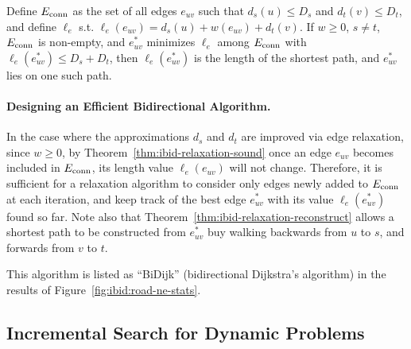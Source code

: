 \begin{theorem}
Define $E_{\mbox{\scriptsize conn}}$ as the set of all edges $e_{uv}$ such that
$d_s(u) \leq D_s$ and $d_t(v) \leq D_t$,
and define $\ell_e$ s.t. $\ell_e(e_{uv}) = d_s(u) + w(e_{uv}) + d_t(v)$.
If $w \geq 0$,
$s \neq t$,
$E_{\mbox{\scriptsize conn}}$ is non-empty,
and $e^*_{uv}$ minimizes $\ell_e$
among $E_{\mbox{\scriptsize conn}}$ with $\ell_e(e^*_{uv}) \leq D_s + D_t$,
then $\ell_e(e^*_{uv})$ is the length of the shortest path,
and $e^*_{uv}$ lies on one such path.
\label{thm:ibid-bidir-sound}
\end{theorem}

\paragraph{Designing an Efficient Bidirectional Algorithm.}
In the case where the approximations $d_s$ and $d_t$ are improved
via edge relaxation,
since $w \geq 0$,
by Theorem~\ref{thm:ibid-relaxation-sound}
once an edge $e_{uv}$ becomes included in
$E_{\mbox{\scriptsize conn}}$,
its length value $\ell_e(e_{uv})$ will not change.
Therefore,
it is sufficient for a relaxation algorithm to consider only edges
newly added to $E_{\mbox{\scriptsize conn}}$ at each iteration,
and keep track of the best edge $e^*_{uv}$
with its value $\ell_e(e^*_{uv})$ found so far.
Note also that Theorem~\ref{thm:ibid-relaxation-reconstruct}
allows a shortest path to be constructed from $e^*_{uv}$
buy walking backwards from $u$ to $s$,
and forwards from $v$ to $t$.

This algorithm is listed as ``BiDijk''
(bidirectional Dijkstra's algorithm)
in the results of Figure~\ref{fig:ibid:road-ne-stats}.


\subsection{Incremental Search for Dynamic Problems}
\label{sec:ibid:incremental}

